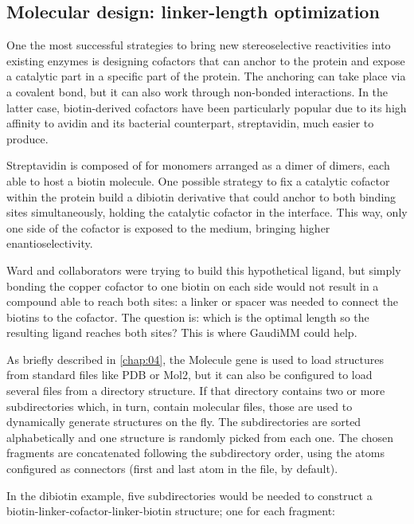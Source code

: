 \subsection{Molecular design: linker-length optimization}
\label{section:dibiotin-linker-length-optimization}
One the most successful strategies to bring new stereoselective reactivities into existing enzymes is designing cofactors that can anchor to the protein and expose a catalytic part in a specific part of the protein. The anchoring can take place via a covalent bond, but it can also work through non-bonded interactions. In the latter case, biotin-derived cofactors have been particularly popular due to its high affinity to avidin and its bacterial counterpart, streptavidin, much easier to produce.

Streptavidin is composed of for monomers arranged as a dimer of dimers, each able to host a biotin molecule. One possible strategy to fix a catalytic cofactor within the protein build a dibiotin derivative that could anchor to both binding sites simultaneously, holding the catalytic cofactor in the interface. This way, only one side of the cofactor is exposed to the medium, bringing higher enantioselectivity.

Ward and collaborators were trying to build this hypothetical ligand, but simply bonding the copper cofactor to one biotin on each side would not result in a compound able to reach both sites: a linker or spacer was needed to connect the biotins to the cofactor. The question is: which is the optimal length so the resulting ligand reaches both sites? This is where GaudiMM could help.

As briefly described in \autoref{chap:04}, the Molecule gene is used to load structures from standard files like PDB or Mol2, but it can also be configured to load several files from a directory structure. If that directory contains two or more subdirectories which, in turn, contain molecular files, those are used to dynamically generate structures on the fly. The subdirectories are sorted alphabetically and one structure is randomly picked from each one. The chosen fragments are concatenated following the subdirectory order, using the atoms configured as connectors (first and last atom in the file, by default).

In the dibiotin example, five subdirectories would be needed to construct a biotin-linker-cofactor-linker-biotin structure; one for each fragment:

